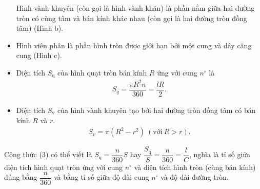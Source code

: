 \begin{tomtat}
\begin{boxdn}
\begin{itemize}
	Hình vành khuyên (còn gọi là hình vành khăn) là phần nằm giữa hai đường tròn có cùng tâm và bán kính khác nhau (còn gọi là hai đường tròn đồng tâm) (Hình b).
	\item
	Hình viên phân là phần hình tròn được giới hạn bởi một cung và dây căng cung (Hình c).
	\end{itemize}
\end{boxdn}
\begin{boxdl}
	\begin{itemize}
	\item Diện tích $S_{\mathrm{q}}$ của hình quạt tròn bán kính $R$ ứng với cung $n^{\circ}$ là
	\begin{align}
	S_{q}=\dfrac{\pi R^2n}{360}=\dfrac{lR}{2}. \tag{3}
	\end{align}
	\item Diện tích $S_{\mathrm{v}}$ của hình vành khuyên tạo bởi hai đường tròn đồng tâm có bán kính $R$ và $r$.
	\begin{align}
	S_{v}=\pi\left(R^{2}-r^{2}\right)~(\text{với}~R>r). \tag{4}
	\end{align}
	\end{itemize}
\end{boxdl}
\begin{nx}
	Công thức (3) có thể viết là $S_{\mathrm{q}}=\dfrac{n}{360}S$ hay $\dfrac{S_{\mathrm{q}}}{S}=\dfrac{n}{360}=\dfrac{l}{C}$, nghĩa là
	tỉ số giữa diện tích hình quạt tròn ứng với cung $n^{\circ}$ và diện tích hình tròn (cùng bán kính) đúng bằng $\dfrac{n}{360}$ và bằng tỉ số giữa độ dài cung $n^{\circ}$ và độ dài đường tròn.
\end{nx}
\end{tomtat}
